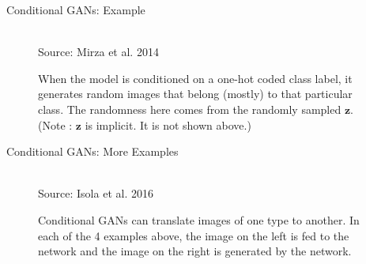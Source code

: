 \begin{frame} {Conditional GANs: Example}
  \vspace{10mm}
  \begin{figure}
    \centering
      \tiny{\\Source: Mirza et al. 2014}
      \caption{\footnotesize When the model is conditioned on a one-hot coded class label, it generates random images that belong (mostly) to that particular class. The randomness here comes from the randomly sampled $\mathbf{z}$. (Note : $\mathbf{z}$ is implicit. It is not shown above.)}
  \end{figure}
\end{frame}

\begin{frame} {Conditional GANs: More Examples}
  \begin{figure}
    \centering
       \tiny{\\Source: Isola et al. 2016}
       \caption{\footnotesize Conditional GANs can translate images of one type to another. In each of the 4 examples above, the image on the left is fed to the network and the image on the right is generated by the network.}
 \end{figure}
\end{frame}


